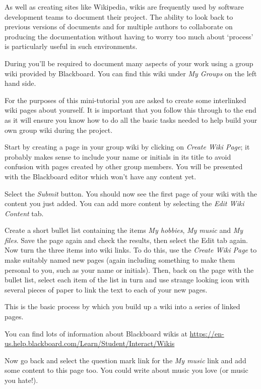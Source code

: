 \begin{firstonly}
As well as creating sites like Wikipedia, wikis are frequently used by
software development teams to document their project. The ability to
look back to previous versions of documents and for multiple authors
to collaborate on producing the documentation without having to worry
too much about `process' is particularly useful in such environments.

During  you'll be required to document many
aspects of your work using a group wiki provided by Blackboard. You
can find this wiki under \emph{My Groups} on the left hand side.

For the purposes of this mini-tutorial you are asked to create some
interlinked wiki pages about yourself. It is important that you follow
this through to the end as it will ensure you know how to do all the
basic tasks needed to help build your own group wiki during the
project.

Start by creating a page in your group wiki by clicking on
\emph{Create Wiki Page}; it probably makes sense to include your name
or initials in its title to avoid confusion with pages created by
other group members. You will be presented with the Blackboard editor
which won't have any content yet.

Select the \emph{Submit} button. You should now see the first page of
your wiki with the content you just added. You can add more content by
selecting the \emph{Edit Wiki Content} tab.

Create a short bullet list containing the items \emph{My hobbies},
\emph{My music} and \emph{My files}.  Save the page again and check
the results, then select the Edit tab again. Now turn the three items
into wiki links. To do this, use the \emph{Create Wiki Page} to make
suitably named new pages (again including something to make them
personal to you, such as your name or initials). Then, back on the
page with the bullet list, select each item of the list in turn and
use strange looking icon with several pieces of paper to link the text
to each of your new pages.

This is the basic process by which you build up a wiki into a series
of linked pages.

You can find lots of information about Blackboard wikis at
{\small\url{https://en-us.help.blackboard.com/Learn/Student/Interact/Wikis}}

Now go back and select the question mark link for the \emph{My music}
link and add some content to this page too. You could write about
music you love (or music you hate!).


\end{firstonly}
